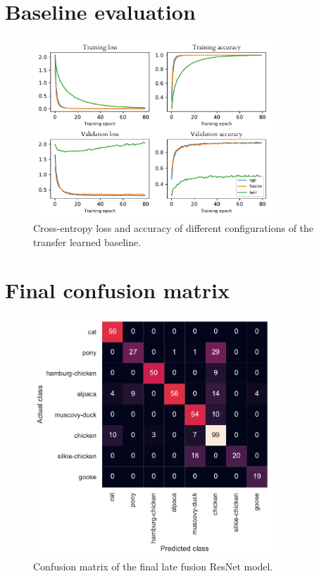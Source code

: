 \documentclass{l4proj}
\begin{document}
\begin{appendices}
\chapter{Baseline evaluation}
\label{appendix_baseline}

\begin{figure}[ht]
  \centering
  \includegraphics[width=0.8\textwidth]{images/evaluation/baseline}
  \caption{Cross-entropy loss and accuracy of different configurations of the transfer learned baseline.}
  \label{fig:baseline_configs}
\end{figure}


\chapter{Final confusion matrix}

\begin{figure}[ht]
  \centering
  \includegraphics[width=0.8\textwidth]{images/evaluation/confusion/final}
  \caption{Confusion matrix of the final late fusion ResNet model.}
  \label{fig:confusion}
\end{figure}


\end{appendices}
\end{document}
